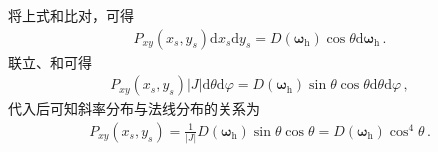 将上式和比对，可得
\begin{align}\label{eq:08-ex01-P2D}
    P_{xy}(x_s,y_s)\mathrm{d}x_s\mathrm{d}y_s=
    D({\bm\omega}_{\mathrm{h}})\cos\theta\mathrm{d}{\bm\omega}_{\mathrm{h}}\, .
\end{align}
联立、和可得
\begin{align}
    P_{xy}(x_s,y_s)|J|\mathrm{d}\theta\mathrm{d}\varphi
    =D({\bm\omega}_{\mathrm{h}})\sin\theta\cos\theta\mathrm{d}\theta\mathrm{d}\varphi\, ,
\end{align}
代入后可知斜率分布与法线分布的关系为
\begin{align}\label{eq:08-ex01-relation-P2D-McrofacetDistribution}
    P_{xy}(x_s,y_s)=\frac{1}{|J|}D({\bm\omega}_{\mathrm{h}})\sin\theta\cos\theta
    =D({\bm\omega}_{\mathrm{h}})\cos^4\theta\, .
\end{align}

